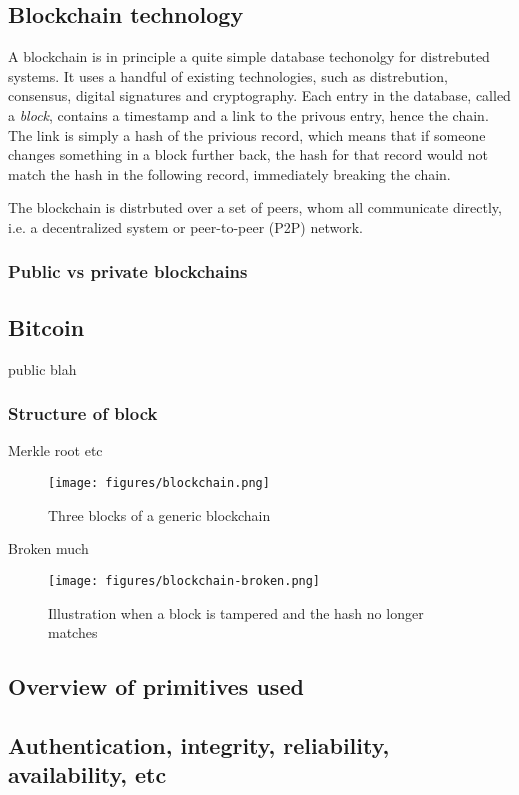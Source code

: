 
\subsection{Blockchain technology}

A blockchain is in principle a quite simple database techonolgy for
distrebuted systems. It uses a handful of existing technologies, such
as distrebution, consensus, digital signatures and cryptography.  Each
entry in the database, called a \textit{block}, contains a timestamp
and a link to the privous entry, hence the chain. The link is simply a
hash of the privious record, which means that if someone changes
something in a block further back, the hash for that record would not
match the hash in the following record, immediately breaking the
chain.

The blockchain is distrbuted over a set of peers, whom all communicate
directly, i.e. a decentralized system or peer-to-peer (P2P) network.


\subsubsection{Public vs private blockchains}

\subsection{Bitcoin}
public blah

\subsubsection{Structure of block}
Merkle root etc

\begin{figure}[ht]
  \centering
  \texttt{[image: figures/blockchain.png]}
  \caption{\label{fig:blockchain} Three blocks of a generic blockchain}
\end{figure}

Broken much

\begin{figure}[ht]
  \centering
  \texttt{[image: figures/blockchain-broken.png]}
  \caption{\label{fig:blockchain-broken} Illustration when a block is
    tampered and the hash no longer matches}
\end{figure}

\subsection{Overview of primitives used}

\subsection{Authentication, integrity, reliability, availability, etc}
